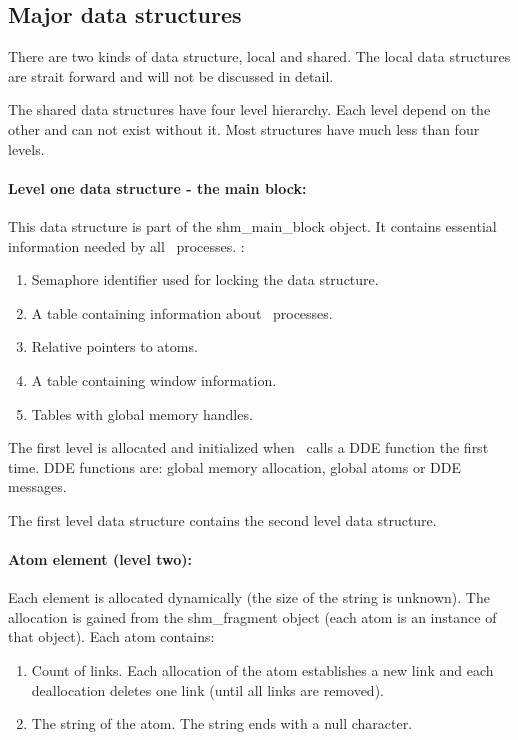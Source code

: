 \subsection{Major data structures}
There are two kinds of data structure, local and shared. The local
data structures are strait forward and will not be discussed in
detail.

The shared data structures have four level hierarchy. Each level
depend on the other and can not exist without it. Most structures have
much less than four levels.

\paragraph{Level one data structure - the main block:}
This data structure is part of the shm\_main\_block object. It
contains essential information needed by all \Wine\ processes. : 
\begin{enumerate}
  \item Semaphore identifier used for locking the data structure.
  \item A table containing information about \Wine\ processes.
  \item Relative pointers to atoms.
  \item A table containing window information.
  \item Tables with global memory handles.
\end{enumerate}

The first level is allocated and initialized when \Wine\ calls a DDE
function the first time. DDE functions are: global memory allocation,
global atoms or DDE messages. 

The first level data structure contains the second level data
structure. 


\paragraph{Atom element (level two):}
Each element is allocated dynamically (the size of the string is
unknown). The allocation is gained from the shm\_fragment object (each
atom is an instance of that object). Each atom contains:
\begin{enumerate}
  \item Count of links. Each allocation of the atom establishes a new
    link and each deallocation deletes one link (until all links are
    removed). 
  \item The string of the atom. The string ends with a null character.
\end{enumerate}

